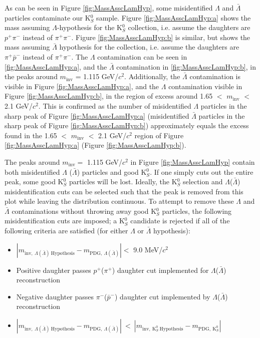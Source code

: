 \documentclass[../AnalysisNoteJBuxton.tex]{subfiles}
\begin{document}
As can be seen in Figure \ref{fig:MassAsscLamHyp}, some misidentified $\Lambda$ and $\bar{\Lambda}$ particles contaminate our K$^{0}_{S}$ sample.
Figure \ref{fig:MassAsscLamHyp:a} shows the mass assuming $\Lambda$-hypothesis for the K$^{0}_{S}$ collection, i.e. assume the daughters are $p^{+}\pi^{-}$ instead of $\pi^{+}\pi^{-}$.
Figure \ref{fig:MassAsscLamHyp:b} is similar, but shows the mass assuming $\bar{\Lambda}$ hypothesis for the collection, i.e. assume the daughters are $\pi^{+}\bar{p}^{-}$ instead of $\pi^{+}\pi^{-}$.
The $\Lambda$ contamination can be seen in \ref{fig:MassAsscLamHyp:a}, and the $\bar{\Lambda}$ contamination in \ref{fig:MassAsscLamHyp:b}, in the peaks around $m_{\mathrm{inv}}$ = 1.115 GeV/$c^{2}$.
Additionally, the $\bar{\Lambda}$ contamination is visible in Figure \ref{fig:MassAsscLamHyp:a}, and the $\Lambda$ contamination visible in Figure \ref{fig:MassAsscLamHyp:b}, in the region of excess around 1.65 $<$ $m_{\mathrm{inv}}$ $<$ 2.1 GeV/$c^{2}$.
This is confirmed as the number of misidentified $\Lambda$ particles in the sharp peak of Figure \ref{fig:MassAsscLamHyp:a} (misidentified $\bar{\Lambda}$ particles in the sharp peak of Figure \ref{fig:MassAsscLamHyp:b}) approximately equals the excess found in the 1.65 $<$ $m_{\mathrm{inv}}$ $<$ 2.1 GeV/$c^{2}$ region of Figure \ref{fig:MassAsscLamHyp:a} (Figure \ref{fig:MassAsscLamHyp:b}).

The peaks around $m_{\mathrm{inv}} = $ 1.115 GeV/$c^{2}$ in Figure \ref{fig:MassAsscLamHyp} contain both misidentified $\Lambda$ ($\bar{\Lambda}$) particles and good K$^{0}_{S}$.
If one simply cuts out the entire peak, some good K$^{0}_{S}$ particles will be lost.
Ideally, the K$^{0}_{S}$ selection and $\Lambda$($\bar{\Lambda}$) misidentification cuts can be selected such that the peak is removed from this plot while leaving the distribution continuous.
To attempt to remove these $\Lambda$ and $\bar{\Lambda}$ contaminations without throwing away good K$^{0}_{S}$ particles, the following misidentification cuts are imposed; a K$^{0}_{S}$ candidate is rejected if all of the following criteria are satisfied (for either $\Lambda$ or $\bar{\Lambda}$ hypothesis):
\begin{itemize}
 \item $\left|m_{\mathrm{inv}, \ \Lambda(\bar{\Lambda}) \ \mathrm{Hypothesis}} - m_{\mathrm{PDG},\ \Lambda(\bar{\Lambda})}\right| < $ 9.0 MeV/$c^{2}$
 \item Positive daughter passes $p^{+}$($\pi^{+}$) daughter cut implemented for $\Lambda$($\bar{\Lambda}$) reconstruction
 \item Negative daughter passes $\pi^{-}$($\bar{p}^{-}$) daughter cut implemented by $\Lambda$($\bar{\Lambda}$) reconstruction
 \item $\left|m_{\mathrm{inv}, \ \Lambda(\bar{\Lambda}) \ \mathrm{Hypothesis}} - m_{\mathrm{PDG},\ \Lambda(\bar{\Lambda})}\right|~ < ~\left|m_{\mathrm{inv},~ \mathrm{K}^{0}_{S}~ \mathrm{Hypothesis}} - m_{\mathrm{PDG},~ \mathrm{K}^{0}_{S}}\right|$
\end{itemize} 
\end{document}
